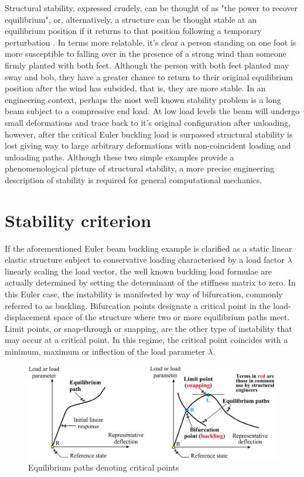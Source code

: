 Structural stability, expressed crudely, can be thought of as "the power to recover equilibrium", or, alternatively, a structure can be thought stable at an equilibrium position if it returns to that position following a temporary perturbation \cite{FelippaStabilityBasics2016}. In terms more relatable, it's clear a person standing on one foot is more susceptible to falling over in the presence of a strong wind than someone firmly planted with both feet. Although the person with both feet planted may sway and bob, they have a greater chance to return to their original equilibrium position after the wind has subsided, that is, they are more stable. In an engineering context, perhaps the most well known stability problem is a long beam subject to a compressive end load. At low load levels the beam will undergo small deformations and trace back to it's original configuration after unloading, however, after the critical Euler buckling load is surpassed structural stability is lost giving way to large arbitrary deformations with non-coincident loading and unloading paths. Although these two simple examples provide a phenomenological picture of structural stability, a more precise engineering description of stability is required for general computational mechanics.

\section{Stability criterion}
If the aforementioned Euler beam buckling example is clarified as a static linear elastic structure subject to conservative loading characterised by a load factor $\lambda$ linearly scaling the load vector, the well known buckling load formulae are actually determined by setting the determinant of the stiffness matrix to zero. In this Euler case, the instability is manifested by way of bifurcation, commonly referred to as buckling. Bifurcation points designate a critical point in the load-displacement space of the structure where two or more equilibrium paths meet. Limit points, or snap-through or snapping, are the other type of instability that may occur at a critical point. In this regime, the critical point coincides with a minimum, maximum or inflection of the load parameter $\lambda$. 

\begin{figure}[H]
	\centering
	\def\svgwidth{\columnwidth}
	\includegraphics[width=12cm]{images/stability_eq_path.png}
	\caption{Equilibrium paths denoting critical points \cite{FelippaStabilityBasics2016}}
	\label{stab1}
\end{figure}


